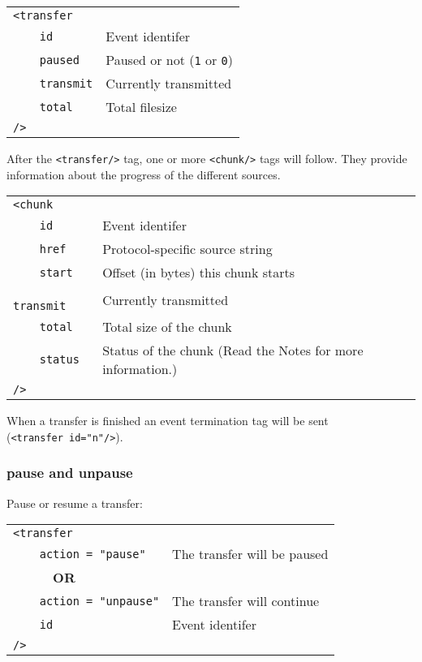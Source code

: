 \documentclass[10pt]{article}
\begin{document}
\begin{tabular}{p{2.6cm}p{8.5cm}}
\verb|<transfer|    &  \\
\verb|    id|           & Event identifer \\
\verb|    paused|       & Paused or not (\verb|1| or \verb|0|) \\
\verb|    transmit|     & Currently transmitted \\
\verb|    total|        & Total filesize \\
\verb|/>|           &
\end{tabular}

After the \verb|<transfer/>| tag, one or more \verb|<chunk/>| tags will follow.
They provide information about the progress of the different sources.

\begin{tabular}{p{2.6cm}p{8.5cm}}
\verb|<chunk|    &  \\
\verb|    id|           & Event identifer \\
\verb|    href|         & Protocol-specific source string \\
\verb|    start|        & Offset (in bytes) this chunk starts \\
\verb|    transmit|     & Currently transmitted \\
\verb|    total|        & Total size of the chunk \\
\verb|    status|       & Status of the chunk (Read the Notes for more information.) \\
\verb|/>|               &
\end{tabular}

When a transfer is finished an event termination tag will be sent \\
(\verb|<transfer id="n"/>|).
  
\subsubsection{pause and unpause}
Pause or resume a transfer:

\begin{tabular}{p{4.1cm}p{7.0cm}}
\verb|<transfer|    &  \\
\verb|    action = "pause"| & The transfer will be paused \\
\verb|      |\textbf{OR}  & \\
\verb|    action = "unpause"| & The transfer will continue \\
\verb|    id|       & Event identifer \\
\verb|/>|           &
\end{tabular}
\end{document}
